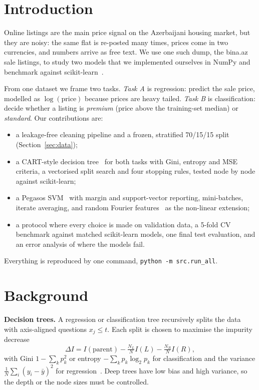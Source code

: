 \documentclass[10pt,twocolumn,a4paper]{article}
\newcommand{\code}[1]{\texttt{#1}}
\begin{document}
\section{Introduction}
Online listings are the main price signal on the Azerbaijani housing
market, but they are noisy: the same flat is re-posted many times, prices
come in two currencies, and numbers arrive as free text. We use one such
dump, the bina.az sale listings, to study two models that we implemented
ourselves in NumPy and benchmark against scikit-learn~\cite{sklearn}.

From one dataset we frame two tasks. \emph{Task A} is regression: predict
the sale price, modelled as $\log(\text{price})$ because prices are heavy
tailed. \emph{Task B} is classification: decide whether a listing is
\emph{premium} (price above the training-set median) or \emph{standard}.
Our contributions are:
\begin{itemize}\setlength\itemsep{0pt}
  \item a leakage-free cleaning pipeline and a frozen, stratified
        70/15/15 split (Section~\ref{sec:data});
  \item a CART-style decision tree~\cite{cart} for both tasks with Gini,
        entropy and MSE criteria, a vectorised split search and four
        stopping rules, tested node by node against scikit-learn;
  \item a Pegasos SVM~\cite{pegasos} with margin and support-vector
        reporting, mini-batches, iterate averaging, and random Fourier
        features~\cite{rff} as the non-linear extension;
  \item a protocol where every choice is made on validation data, a
        5-fold CV benchmark against matched scikit-learn models, one final
        test evaluation, and an error analysis of where the models fail.
\end{itemize}
Everything is reproduced by one command, \code{python -m src.run\_all}.

\section{Background}
\textbf{Decision trees.} A regression or classification tree recursively
splits the data with axis-aligned questions $x_j \le t$. Each split is
chosen to maximise the impurity decrease
\begin{equation}
  \Delta I = I(\text{parent}) - \tfrac{N_L}{N} I(L) - \tfrac{N_R}{N} I(R),
\end{equation}
with Gini $1-\sum_k p_k^2$ or entropy $-\sum_k p_k\log_2 p_k$ for
classification and the variance $\frac{1}{N}\sum_i (y_i-\bar y)^2$ for
regression~\cite{cart}. Deep trees have low bias and high variance, so the
depth or the node sizes must be controlled.
\end{document}
